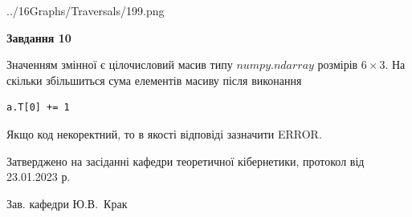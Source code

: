 \documentclass[12pt, ukrainian]{article}
\begin{document}
{\begin {large}
\begin{center}
	{../16Graphs/Traversals/199.png}
\end{center}\par
\newpage

{\begin {center}\textbf{Завдання 10}\end {center}}\par
Значенням змінної  є цілочисловий масив типу $numpy.ndarray$ розмірів $6{\times}3$. На скільки збільшиться сума елементів масиву  після виконання
\begin{verbatim}
a.T[0] += 1
\end{verbatim}


Якщо код некоректний, то в якості відповіді зазначити ERROR.\par
\newpage


\end {large}
}
{\smallskip \begin {small} Затверджено на засіданні кафедри теоретичної кібернетики, протокол  від   23.01.2023 р.\par\smallskip\smallskip
{\parbox {6.5 cm}{Зав. кафедри \dotfill Ю.В.~Крак}} \end{small}}
\end{document}
